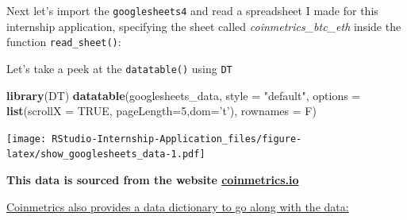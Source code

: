 \documentclass[
]{book}
\newenvironment{Shaded}{\begin{snugshade}}{\end{snugshade}}
\newcommand{\DataTypeTok}[1]{\textcolor[rgb]{0.13,0.29,0.53}{#1}}
\newcommand{\DecValTok}[1]{\textcolor[rgb]{0.00,0.00,0.81}{#1}}
\newcommand{\KeywordTok}[1]{\textcolor[rgb]{0.13,0.29,0.53}{\textbf{#1}}}
\newcommand{\NormalTok}[1]{#1}
\newcommand{\OperatorTok}[1]{\textcolor[rgb]{0.81,0.36,0.00}{\textbf{#1}}}
\newcommand{\OtherTok}[1]{\textcolor[rgb]{0.56,0.35,0.01}{#1}}
\newcommand{\StringTok}[1]{\textcolor[rgb]{0.31,0.60,0.02}{#1}}
\begin{document}
Next let's import the \texttt{googlesheets4} and read a spreadsheet I made for this internship application, specifying the sheet called \emph{coinmetrics\_btc\_eth} inside the function \texttt{read\_sheet()}:

\begin{Shaded}
\end{Shaded}

Let's take a peek at the \texttt{datatable()} using \texttt{DT} \citep{R-DT}

\begin{Shaded}
\begin{Highlighting}[]
\KeywordTok{library}\NormalTok{(DT)}
\KeywordTok{datatable}\NormalTok{(googlesheets_data,  }\DataTypeTok{style =} \StringTok{"default"}\NormalTok{, }
          \DataTypeTok{options =} \KeywordTok{list}\NormalTok{(}\DataTypeTok{scrollX =} \OtherTok{TRUE}\NormalTok{, }\DataTypeTok{pageLength=}\DecValTok{5}\NormalTok{,}\DataTypeTok{dom=}\StringTok{'t'}\NormalTok{), }\DataTypeTok{rownames =}\NormalTok{ F)}
\end{Highlighting}
\end{Shaded}

\texttt{[image: RStudio-Internship-Application\_files/figure-latex/show\_googlesheets\_data-1.pdf]}

\textbf{This data is sourced from the website \href{https://coinmetrics.io/community-network-data/\#comm-files}{coinmetrics.io}}

\href{https://coinmetrics.io/community-data-dictionary/}{Coinmetrics also provides a data dictionary to go along with the data:}
\end{document}
